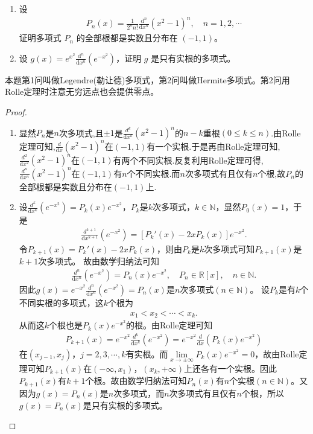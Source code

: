 \documentclass[../../main.tex]{subfiles}
\begin{document}
\begin{example}
\begin{enumerate}
\item 设
\begin{align}
P_n(x)=\frac{1}{2^n n!}\frac{\mathrm{d}^n}{\mathrm{d}x^n}(x^2 - 1)^n, \quad n = 1, 2, \cdots
\end{align}
证明多项式 \( P_n \) 的全部根都是实数且分布在 \( (-1, 1) \)。

\item 设 \( g(x)=e^{x^2}\frac{\mathrm{d}^n}{\mathrm{d}x^n}(e^{-x^2}) \)，证明 \( g \) 是只有实根的多项式。
\end{enumerate}
\end{example}
\begin{note}
本题第1问叫做Legendre(勒让德)多项式，第2问叫做Hermite多项式。第2问用Rolle定理时注意无穷远点也会提供零点。
\end{note}
\begin{proof}
\begin{enumerate}
\item 显然$P_n$是$n$次多项式,且$\pm 1$是$\frac{d^k}{\mathrm{d}x^k}(x^2-1)^n$的$n-k$重根$(0\leqslant k\leqslant n)$.由Rolle定理可知,$\frac{d}{\mathrm{d}x}(x^2-1)^n$在$(-1,1)$有一个实根.于是再由Rolle定理可知,$\frac{d^2}{\mathrm{d}x^2}(x^2-1)^n$在$(-1,1)$有两个不同实根.反复利用Rolle定理可得,$\frac{d^n}{\mathrm{d}x^n}(x^2-1)^n$在$(-1,1)$有$n$个不同实根.而$n$次多项式有且仅有$n$个根,故$P_n$的全部根都是实数且分布在$(-1,1)$上.

\item 设$\frac{d^k}{\mathrm{d}x^k}(e^{-x^2}) = P_k(x)e^{-x^2}$，$P_k$是$k$次多项式，$k\in \mathbb{N}$，显然$P_0(x) = 1$，于是
\begin{align*}
\frac{d^{k+1}}{\mathrm{d}x^{k+1}}(e^{-x^2}) = \left[ P_k'(x) - 2xP_k(x) \right] e^{-x^2}.
\end{align*}
令$P_{k+1}(x) = P_k'(x) - 2xP_k(x)$，则由$P_k$是$k$次多项式可知$P_{k+1}(x)$是$k+1$次多项式。
故由数学归纳法可知
\begin{align*}
\frac{d^n}{\mathrm{d}x^n}(e^{-x^2}) = P_n(x)e^{-x^2}, \quad P_n \in \mathbb{R}[x], \quad n \in \mathbb{N}.
\end{align*}
因此$g(x) = e^{-x^2}\frac{d^n}{\mathrm{d}x^n}(e^{-x^2}) = P_n(x)$是$n$次多项式$(n \in \mathbb{N})$。
设$P_k$是有$k$个不同实根的多项式，这$k$个根为
\begin{align*}
x_1 < x_2 < \cdots < x_k.
\end{align*}
从而这$k$个根也是$P_k(x)e^{-x^2}$的根。由Rolle定理可知
\begin{align*}
P_{k+1}(x) = e^{-x^2}\frac{d^k}{\mathrm{d}x^k}(e^{-x^2}) = e^{-x^2}\frac{d}{\mathrm{d}x}\left( P_k(x)e^{-x^2} \right)
\end{align*}
在$(x_{j-1}, x_j)$，$j=2,3,\cdots,k$有实根。而$\lim\limits_{x \rightarrow \pm \infty} P_k(x)e^{-x^2} = 0$，故由Rolle定理可知$P_{k+1}(x)$在$(-\infty, x_1)$，$(x_k, +\infty)$上还各有一个实根。因此$P_{k+1}(x)$有$k+1$个根。故由数学归纳法可知$P_n(x)$有$n$个实根$(n \in \mathbb{N})$。又因为$g(x) = P_n(x)$是$n$次多项式，而$n$次多项式有且仅有$n$个根，所以$g(x) = P_n(x)$是只有实根的多项式。
\end{enumerate}
\end{proof}
\end{document}
